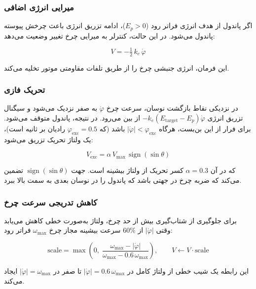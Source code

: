 \subsubsection{میرایی انرژی اضافی}

اگر پاندول از هدف انرژی فراتر رود ($E_p > 0$)، ادامه تزریق انرژی باعث چرخش پیوسته پاندول می‌شود. در این حالت، کنترلر به میرایی چرخ تغییر وضعیت می‌دهد:

\begin{equation}
    V = -\tfrac{1}{2}\, k_e\, \dot\varphi
\end{equation}

این فرمان، انرژی جنبشی چرخ را از طریق تلفات مقاومتی موتور تخلیه می‌کند.

\subsubsection{تحریک فازى}

در نزدیکی نقاط بازگشت نوسان، سرعت چرخ $\dot\varphi$ به صفر نزدیک می‌شود و سیگنال تزریق انرژی $-k_e (E_{\text{target}} - E_p) \dot\varphi$ از بین می‌رود. در نتیجه، پاندول متوقف می‌شود. برای فرار از این بن‌بست، هرگاه $|\dot\varphi| < \varphi_{\text{exc}}$ باشد (که $\varphi_{\text{exc}} = 0.5$ رادیان بر ثانیه است)، یک ولتاژ تحریک تزریق می‌شود:

\begin{equation}
    V_{\text{exc}} = \alpha\, V_{\max}\, \operatorname{sign}(\sin\theta)
\end{equation}

که در آن $\alpha = 0.3$ کسر تحریک از ولتاژ بیشینه است. جهت $\operatorname{sign}(\sin\theta)$ تضمین می‌کند که ضربه چرخ در جهتی باشد که پاندول را در نوسان بعدی به سمت بالا ببرد.

\subsubsection{کاهش تدریجی سرعت چرخ}

برای جلوگیری از شتاب‌گیری بیش از حد چرخ، ولتاژ به‌صورت خطی کاهش می‌یابد وقتی $|\dot\varphi|$ از $60\%$ سرعت بیشینه مجاز چرخ $\omega_{\max}$ فراتر رود:

\begin{equation}
    \text{scale} = \max\!\left(0,\; \frac{\omega_{\max} - |\dot\varphi|}{\omega_{\max} - 0.6\,\omega_{\max}}\right), \qquad V \leftarrow V \cdot \text{scale}
\end{equation}

این رابطه یک شیب خطی از ولتاژ کامل در $|\dot\varphi| = 0.6\,\omega_{\max}$ تا صفر در $|\dot\varphi| = \omega_{\max}$ ایجاد می‌کند.

